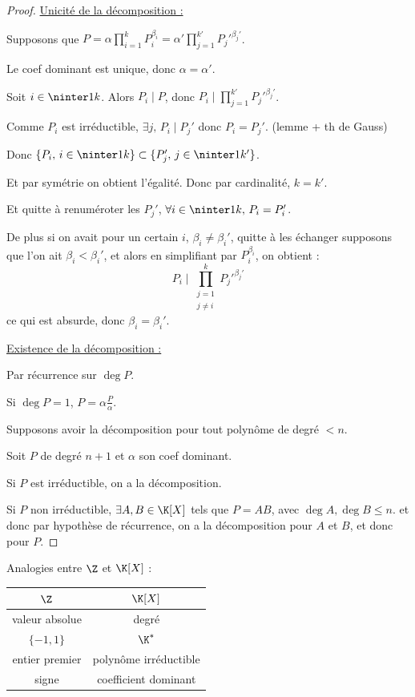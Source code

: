 \begin{proof}
    \uline{Unicité de la décomposition :}

    Supposons que $\displaystyle P = \alpha \prod_{i = 1}^k P_i^{\beta_i} = \alpha' \prod_{j = 1}^{k'} P_j'^{\beta_j'}$.

    Le coef dominant est unique, donc $\alpha = \alpha'$.

    Soit $i \in \ninter 1 k$. Alors $P_i \mid P$, donc $\displaystyle P_i \mid \prod_{j = 1}^{k'} P_j'^{\beta_j'}$.

    Comme $P_i$ est irréductible, $\exists j, \, P_i \mid P_j'$ donc $P_i = P_j'$. (lemme + th de Gauss)

    Donc $\{P_i, \, i \in \ninter 1 k \} \subset \{P_j', \, j \in \ninter 1 {k'}\}$.

    Et par symétrie on obtient l'égalité. Donc par cardinalité, $k = k'$.

    Et quitte à renuméroter les $P_j'$, $\forall i \in \ninter 1 k, \, P_i = P_i'$.

    De plus si on avait pour un certain $i$, $\beta_i \neq \beta_i'$, quitte à les échanger supposons 
    que l'on ait $\beta_i < \beta_i'$, et alors en simplifiant par $P_i^{\beta_i}$, on obtient :
    \[P_i \mid \prod_{\substack{j = 1 \\ j \neq i}}^k P_j'^{\beta_j'}\]
    ce qui est absurde, donc $\beta_i = \beta_i'$.

    \uline{Existence de la décomposition :}

    Par récurrence sur $\deg P$. 

    Si $\deg P = 1$, $P = \alpha \frac P \alpha$. 

    Supposons avoir la décomposition pour tout polynôme de degré $< n$. 

    Soit $P$ de degré $n + 1$ et $\alpha$ son coef dominant.

    Si $P$ est irréductible, on a la décomposition.

    Si $P$ non irréductible, $\exists A, B \in \K[X]$ tels que $P = AB$, avec $\deg A, \deg B \leqslant n$.
    et donc par hypothèse de récurrence, on a la décomposition pour $A$ et $B$, et donc pour $P$.
\end{proof}

\begin{remarque}
    Analogies entre $\Z$ et $\K[X]$ :
    \begin{table}[htpb]
        \centering
        \begin{tabular}{cc}
            \toprule
            $\Z$ & $\K[X]$ \\
            \midrule
            valeur absolue & degré \\
            $\{-1,1\}$ & $\K^*$ \\
            entier premier & polynôme irréductible \\
            signe & coefficient dominant \\
            \bottomrule
        \end{tabular}
    \end{table}
\end{remarque}

